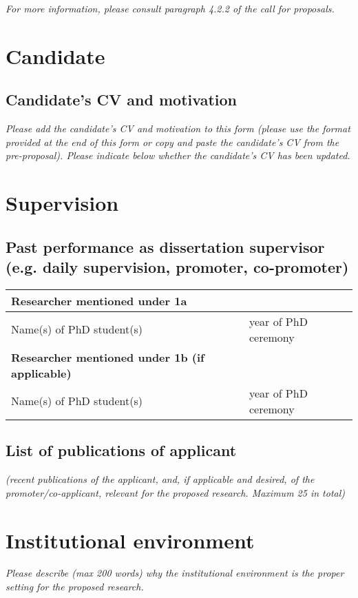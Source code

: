 \noindent{}

\textit{For more information, please consult paragraph 4.2.2 of the call for proposals.}

\section{Candidate}
\subsection{Candidate's CV and motivation}
\textit{Please add the candidate’s CV and motivation to this form (please use the format provided at the end of this form or copy and paste the candidate’s CV from the pre-proposal). Please indicate below whether the candidate’s CV has been updated.}

\section{Supervision}
\subsection{Past performance as dissertation supervisor (e.g. daily supervision, promoter, co-promoter)}

\begin{tabular}{|l|l|}
\hline
	\textbf{Researcher mentioned under 1a} & \\
\hline
	Name(s) of PhD student(s) & year of PhD ceremony \\
\hline
	\textbf{Researcher mentioned under 1b (if applicable)} & \\
\hline
	Name(s) of PhD student(s) & year of PhD ceremony \\
\hline
\end{tabular}

\subsection{List of publications of applicant}
\textit{(recent publications of the applicant, and, if applicable and desired, of the promoter/co-applicant, relevant for the proposed research. Maximum 25 in total)}

\section{Institutional environment}
\textit{Please describe (max 200 words) why the institutional environment is the proper setting for the proposed research.}